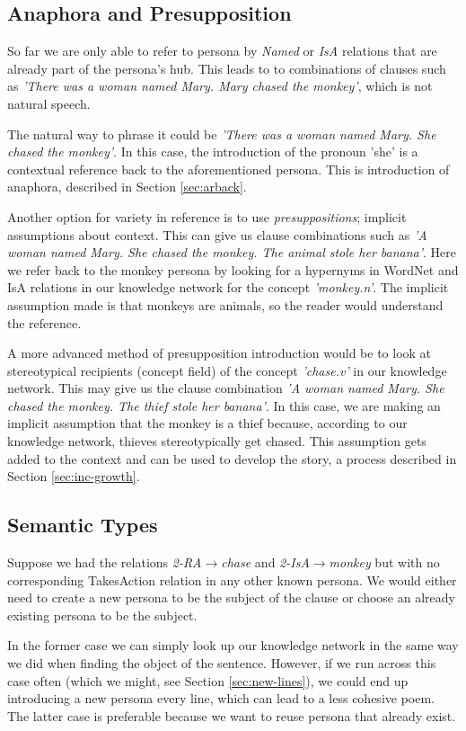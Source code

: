 \subsection{Anaphora and Presupposition}
So far we are only able to refer to persona by \textit{Named} or \textit{IsA} relations that are already part of the persona's hub. This leads to to combinations of clauses such as \textit{'There was a woman named Mary. Mary chased the monkey'}, which is not natural speech.

The natural way to phrase it could be \textit{'There was a woman named Mary. She chased the monkey'}. In this case, the introduction of the pronoun 'she' is a contextual reference back to the aforementioned persona. This is introduction of anaphora, described in Section \ref{sec:arback}.

Another option for variety in reference is to use \textit{presuppositions}; implicit assumptions about context. This can give us clause combinations such as \textit{'A woman named Mary. She chased the monkey. The animal stole her banana'}. Here we refer back to the monkey persona by looking for a hypernyms in WordNet and IsA relations in our knowledge network for the concept \textit{'monkey.n'}. The implicit assumption made is that monkeys are animals, so the reader would understand the reference.

A more advanced method of presupposition introduction would be to look at stereotypical recipients (concept field) of the concept \textit{'chase.v'} in our knowledge network. This may give us the clause combination \textit{'A woman named Mary. She chased the monkey. The thief stole her banana'}. In this case, we are making an implicit assumption that the monkey is a thief because, according to our knowledge network, thieves stereotypically get chased. This assumption gets added to the context and can be used to develop the story, a process described in Section \ref{sec:inc-growth}.

\subsection{Semantic Types}
\label{sec:sem-type} 
Suppose we had the relations \textit{2-RA$\rightarrow$chase} and \textit{2-IsA$\rightarrow$monkey} but with no corresponding TakesAction relation in any other known persona. We would either need to create a new persona to be the subject of the clause or choose an already existing persona to be the subject.

In the former case we can simply look up our knowledge network in the same way we did when finding the object of the sentence. However, if we run across this case often (which we might, see Section \ref{sec:new-lines}), we could end up introducing a new persona every line, which can lead to a less cohesive poem. The latter case is preferable because we want to reuse persona that already exist.


